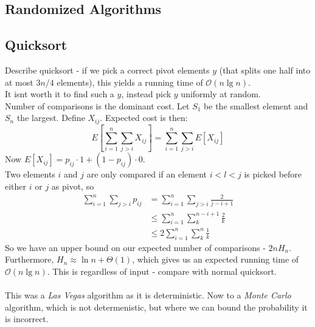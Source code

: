 \documentclass[a4paper]{article}
\author{Nikolaj Dybdahl Rathcke (rfq695)}
\begin{document}
\begin{center}
\section*{Randomized Algorithms}
\end{center}
\subsection*{Quicksort}
Describe quicksort - if we pick a correct pivot elements $y$ (that splits one half into at most $3n/4$ elements), this yields a running time of $\mathcal{O}(n\lg n)$. \\
It isnt worth it to find such a $y$, instead pick $y$ uniformly at random. \\
Number of comparisons is the dominant cost. Let $S_1$ be the smallest element and $S_n$ the largest. Define $X_{ij}$. Expected cost is then:
$$E[\sum_{i=1}^n\sum_{j>i}X_{ij}]=\sum_{i=1}^n\sum_{j>i}E[X_{ij}]$$
Now $E[X_{ij}]=p_{ij}\cdot 1 + (1-p_{ij})\cdot 0$. \\
Two elements $i$ and $j$ are only compared if an element $i<l<j$ is picked before either $i$ or $j$ as pivot, so
\begin{align*}
\sum_{i=1}^n\sum_{j>i}p_{ij}&=\sum_{i=1}^n\sum_{j>i}\frac{2}{j-i+1} \\
&\leq \sum_{i=1}^n\sum_{k}^{n-i+1}\frac{2}{k} \\
&\leq 2\sum_{i=1}^n\sum_{k}^{n}\frac{1}{k}
\end{align*}
So we have an upper bound on our expected number of comparisons - $2nH_n$. \\
Furthermore, $H_n\approx \ln n+\Theta(1)$, which gives us an expected running time of $\mathcal{O}(n\lg n)$. This is regardless of input - compare with normal quicksort. \\
\\
This was a \textit{Las Vegas} algorithm as it is deterministic. Now to a \textit{Monte Carlo} algorithm, which is not determenistic, but where we can bound the probability it is incorrect.
\end{document}
